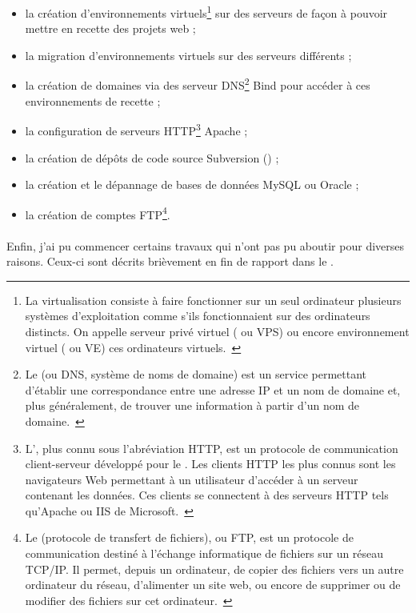 \begin{itemize}
	\item la création d'environnements virtuels\footnote{La virtualisation consiste à faire fonctionner sur un seul ordinateur plusieurs systèmes d'exploitation comme s'ils fonctionnaient sur des ordinateurs distincts. On appelle serveur privé virtuel ( ou VPS) ou encore environnement virtuel ( ou VE) ces ordinateurs virtuels.~\cite{virtualisation}} sur des serveurs de façon à pouvoir mettre en recette des projets web ;
	\item la migration d'environnements virtuels sur des serveurs différents ;
	\item la création de domaines via des serveur DNS\footnote{Le  (ou DNS, système de noms de domaine) est un service permettant d'établir une correspondance entre une adresse IP et un nom de domaine et, plus généralement, de trouver une information à partir d'un nom de domaine.~\cite{dns}} Bind pour accéder à ces environnements de recette ;
	\item la configuration de serveurs HTTP\footnote{L', plus connu sous l'abréviation HTTP, est un protocole de communication client-serveur développé pour le . Les clients HTTP les plus connus sont les navigateurs Web permettant à un utilisateur d'accéder à un serveur contenant les données. Ces clients se connectent à des serveurs HTTP tels qu'Apache ou IIS de Microsoft.~\cite{http}} Apache ;
	\item la création de dépôts de code source Subversion () ;
	\item la création et le dépannage de bases de données MySQL ou Oracle ;
	\item la création de comptes FTP\footnote{Le  (protocole de transfert de fichiers), ou FTP, est un protocole de communication destiné à l'échange informatique de fichiers sur un réseau TCP/IP. Il permet, depuis un ordinateur, de copier des fichiers vers un autre ordinateur du réseau, d'alimenter un site web, ou encore de supprimer ou de modifier des fichiers sur cet ordinateur.~\cite{ftp}}.
\end{itemize}

\paragraph{}
Enfin, j'ai pu commencer certains travaux qui n'ont pas pu aboutir pour diverses raisons.
Ceux-ci sont décrits brièvement en fin de rapport dans le .



